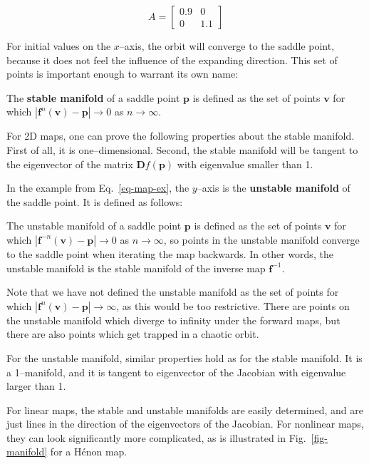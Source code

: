 \begin{equation}
A =
\begin{bmatrix}
0.9 & 0 \\
0 & 1.1
\end{bmatrix} 
\label{eq-map-ex}
\end{equation} 

For initial values on the $x$--axis, the orbit will converge to the saddle point, because it does not feel the influence of the expanding direction. This set of points is important enough to warrant its own name:

The \textbf{stable manifold} of a saddle point ${\mathbf p}$ is defined as the set of points ${\mathbf v}$ for which $|{\mathbf f}^n({\mathbf v}) - {\mathbf p} | \to 0$ as $ n \to \infty$.

\noident{}For 2D maps, one can prove the following properties about the stable manifold. First of all, it is one--dimensional. Second, the stable manifold will be tangent to the eigenvector of the matrix ${\mathbf Df}({\mathbf p})$ with eigenvalue smaller than 1.

In the example from Eq.~\ref{eq-map-ex}, the $y$--axis is the \textbf{unstable manifold} of the saddle point. It is defined as follows:

The unstable manifold of a saddle point ${\mathbf p}$ is defined as the set of points ${\mathbf v}$ for which $|{\mathbf f}^{-n}({\mathbf v}) - {\mathbf p}| \to 0$ as $ n \to \infty$, so points in the unstable manifold converge to the saddle point when iterating the map backwards. In other words, the unstable manifold is the stable manifold of the inverse map ${\mathbf f}^{-1}$.

Note that we have not defined the unstable manifold as the set of points for which $|{\mathbf f}^{n}({\mathbf v}) - {\mathbf p}| \to \infty$, as this would be too restrictive. There are points on the unstable manifold which diverge to infinity under the forward maps, but there are also points which get trapped in a chaotic orbit.

For the unstable manifold, similar properties hold as for the stable manifold. It is a 1--manifold, and it is tangent to eigenvector of the Jacobian with eigenvalue larger than 1.

For linear maps, the stable and unstable manifolds are easily determined, and are just lines in the direction of the eigenvectors of the Jacobian. For nonlinear maps, they can look significantly more complicated, as is illustrated in Fig.~\ref{fig-manifold} for a H\'{e}non map. 

